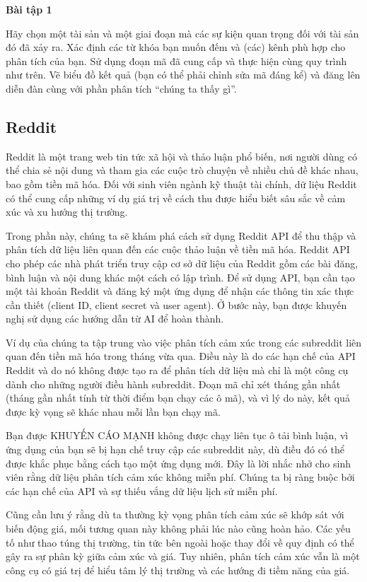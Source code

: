 \textbf{Bài tập 1}

Hãy chọn một tài sản và một giai đoạn mà các sự kiện quan trọng đối với tài sản đó đã xảy ra. Xác định các từ khóa bạn muốn đếm và (các) kênh phù hợp cho phân tích của bạn. Sử dụng đoạn mã đã cung cấp và thực hiện cùng quy trình như trên. Vẽ biểu đồ kết quả (bạn có thể phải chỉnh sửa mã đáng kể) và đăng lên diễn đàn cùng với phần phân tích ``chúng ta thấy gì''.

\subsection{Reddit}

Reddit là một trang web tin tức xã hội và thảo luận phổ biến, nơi người dùng có thể chia sẻ nội dung và tham gia các cuộc trò chuyện về nhiều chủ đề khác nhau, bao gồm tiền mã hóa. Đối với sinh viên ngành kỹ thuật tài chính, dữ liệu Reddit có thể cung cấp những ví dụ giá trị về cách thu được hiểu biết sâu sắc về cảm xúc và xu hướng thị trường.

Trong phần này, chúng ta sẽ khám phá cách sử dụng Reddit API để thu thập và phân tích dữ liệu liên quan đến các cuộc thảo luận về tiền mã hóa. Reddit API cho phép các nhà phát triển truy cập cơ sở dữ liệu của Reddit gồm các bài đăng, bình luận và nội dung khác một cách có lập trình. Để sử dụng API, bạn cần tạo một tài khoản Reddit và đăng ký một ứng dụng để nhận các thông tin xác thực cần thiết (client ID, client secret và user agent). Ở bước này, bạn được khuyến nghị sử dụng các hướng dẫn từ AI để hoàn thành.

Ví dụ của chúng ta tập trung vào việc phân tích cảm xúc trong các subreddit liên quan đến tiền mã hóa trong tháng vừa qua. Điều này là do các hạn chế của API Reddit và do nó không được tạo ra để phân tích dữ liệu mà chỉ là một công cụ dành cho những người điều hành subreddit. Đoạn mã chỉ xét tháng gần nhất (tháng gần nhất tính từ thời điểm bạn chạy các ô mã), và vì lý do này, kết quả được kỳ vọng sẽ khác nhau mỗi lần bạn chạy mã.

Bạn được KHUYẾN CÁO MẠNH không được chạy liên tục ô tải bình luận, vì ứng dụng của bạn sẽ bị hạn chế truy cập các subreddit này, dù điều đó có thể được khắc phục bằng cách tạo một ứng dụng mới. Đây là lời nhắc nhở cho sinh viên rằng dữ liệu phân tích cảm xúc không miễn phí. Chúng ta bị ràng buộc bởi các hạn chế của API và sự thiếu vắng dữ liệu lịch sử miễn phí.

Cũng cần lưu ý rằng dù ta thường kỳ vọng phân tích cảm xúc sẽ khớp sát với biến động giá, mối tương quan này không phải lúc nào cũng hoàn hảo. Các yếu tố như thao túng thị trường, tin tức bên ngoài hoặc thay đổi về quy định có thể gây ra sự phân kỳ giữa cảm xúc và giá. Tuy nhiên, phân tích cảm xúc vẫn là một công cụ có giá trị để hiểu tâm lý thị trường và các hướng đi tiềm năng của giá.

